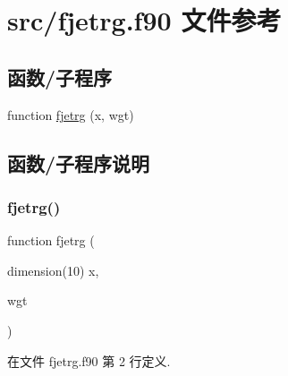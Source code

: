 \hypertarget{fjetrg_8f90}{}\section{src/fjetrg.f90 文件参考}
\label{fjetrg_8f90}
\subsection*{函数/子程序}
\begin{DoxyCompactItemize}
\item 
function \mbox{\hyperlink{fjetrg_8f90_ad6224d883c74ca125716b789aa980f5f}{fjetrg}} (x, wgt)
\end{DoxyCompactItemize}


\subsection{函数/子程序说明}
\mbox{\label{fjetrg_8f90_ad6224d883c74ca125716b789aa980f5f}} 
\subsubsection{\texorpdfstring{fjetrg()}{fjetrg()}}
{\footnotesize\ttfamily function fjetrg (\begin{DoxyParamCaption}\item[{dimension(10)}]{x,  }\item[{}]{wgt }\end{DoxyParamCaption})}



在文件 fjetrg.\+f90 第 2 行定义.

